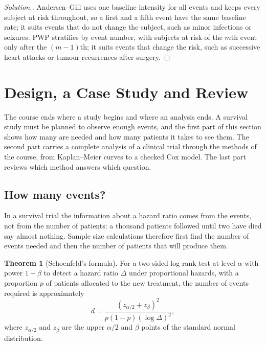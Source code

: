 \documentclass[11pt,a4paper]{article}
\numberwithin{equation}{section}
\theoremstyle{definition}
\newtheorem{thm}{Theorem}[subsection]
\newenvironment{solution}
  {\renewcommand{\qedsymbol}{}\begin{proof}[\textit{Solution}.]}
  {\end{proof}}
\begin{document}
\begin{solution}
Andersen--Gill uses one baseline intensity for all events and keeps every subject at risk throughout, so a first and a fifth event have the same baseline rate; it suits events that do not change the subject, such as minor infections or seizures. PWP stratifies by event number, with subjects at risk of the $m$th event only after the $(m-1)$th; it suits events that change the risk, such as successive heart attacks or tumour recurrences after surgery.
\end{solution}

\section{Design, a Case Study and Review}
\label{sec:design}

The course ends where a study begins and where an analysis ends. A survival study must be planned to observe enough events, and the first part of this section shows how many are needed and how many patients it takes to see them. The second part carries a complete analysis of a clinical trial through the methods of the course, from Kaplan--Meier curves to a checked Cox model. The
last part reviews which method answers which question.

\subsection{How many events?}
\label{ssec:samplesize}

In a survival trial the information about a hazard ratio comes from the events, not from the number of patients: a thousand patients followed until two have died say almost nothing. Sample size calculations therefore first find the number of events needed and then the number of patients that will produce them.

\begin{thm}[Schoenfeld's formula]
\label{thm:schoenfeld}
For a two-sided log-rank test at level $\alpha$ with power $1 - \beta$ to detect a hazard ratio $\Delta$ under proportional hazards, with a proportion $p$ of patients allocated to the new treatment, the number of events required is approximately
\[
d = \frac{(z_{\alpha/2} + z_\beta)^2}{p(1 - p)(\log\Delta)^2} ,
\]
where $z_{\alpha/2}$ and $z_\beta$ are the upper $\alpha/2$ and $\beta$ points of the standard normal distribution.
\end{thm}
\end{document}
